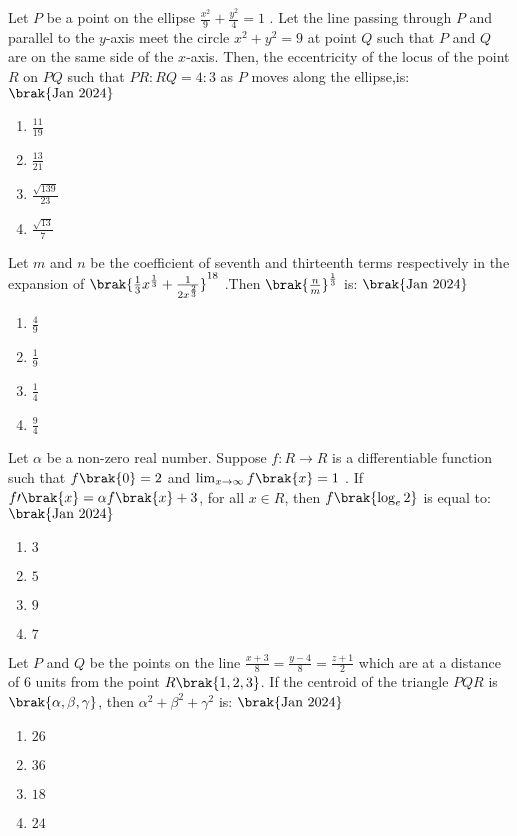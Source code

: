 \item{
Let $P$ be a point on the ellipse $\frac{x^2}{9}+\frac{y^2}{4}=1$ . Let the line passing through $P$ and parallel to the $y$-axis meet the circle $x^2+y^2=9$ at point $Q$ such that $P$ and $Q$ are on the same side of the $x$-axis. Then, the eccentricity of the locus of the point $R$ on $PQ$ such that $PR:RQ=4:3$ as $P$ moves along the ellipse,is:
\hfill{$\brak{\text{Jan 2024}}$}
\begin{multicols}{4}
\begin{enumerate}
\item $\frac{11}{19}$
\item $\frac{13}{21}$
\item $\frac{\sqrt{139}}{23}$
\item $\frac{\sqrt{13}}{7}$
\end{enumerate}
\end{multicols}
}
\item{
Let $m$ and $n$ be the coefficient of seventh and thirteenth terms respectively in the expansion of $\brak{\frac{1}{3}x^{\frac{1}{3}}+\frac{1}{2x^\frac{2}{3}}}^{18}$ .Then $\brak{\frac{n}{m}}^\frac{1}{3}$ is:
\hfill{$\brak{\text{Jan 2024}}$}
\begin{multicols}{4}
\begin{enumerate}
\item $\frac{4}{9}$
\item $\frac{1}{9}$
\item $\frac{1}{4}$
\item $\frac{9}{4}$
\end{enumerate}
\end{multicols}
}
\item{
Let $\alpha$ be a non-zero real number. Suppose $f:R\to R$ is a differentiable function such that $f\brak{0}=2$ and $\lim_{x\to\infty}f\brak{x}=1$ . If $f\prime\brak{x}=\alpha f\brak{x}+3$, for all $x\in R$, then $f\brak{\log_e2}$ is equal to:
\hfill{$\brak{\text{Jan 2024}}$}
\begin{multicols}{4}
\begin{enumerate}
\item $3$
\item $5$
\item $9$
\item $7$
\end{enumerate}
\end{multicols}
}
\item{
Let $P$ and $Q$ be the points on the line $\frac{x+3}{8}=\frac{y-4}{8}=\frac{z+1}{2}$ which are at a distance of $6$ units from the point $R\brak{1,2,3}$. If the centroid of the triangle $PQR$ is $\brak{\alpha,\beta,\gamma}$, then $\alpha^2+\beta^2+\gamma^2$ is:
\hfill{$\brak{\text{Jan 2024}}$}
\begin{multicols}{4}
\begin{enumerate}
\item $26$
\item $36$
\item $18$
\item $24$
\end{enumerate}
\end{multicols}
}
